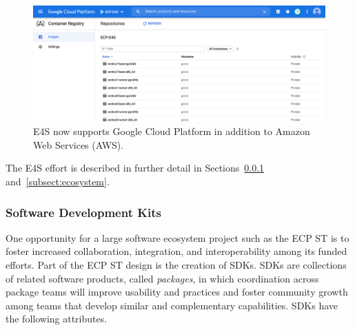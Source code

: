 \begin{figure}
	\centering
	\includegraphics[width=0.9\linewidth]{E4S-GCP}
	\caption{E4S now supports Google Cloud Platform in addition to Amazon Web Services (AWS).}
	\label{fig:e4s-gcp-image}
\end{figure}

The E4S effort is described in further detail in Sections~\ref{subsubsect:sdks} and~\ref{subsect:ecosystem}.

\subsubsection{Software Development Kits}\label{subsubsect:sdks}
One opportunity for a large software ecosystem project such as the ECP ST is to foster increased collaboration, integration, and interoperability among its funded efforts. Part of the ECP ST design is the creation of SDKs.  SDKs are collections of related software products, called \textit{packages}, in which coordination across package teams will improve usability and practices and foster community growth among teams that develop similar and complementary capabilities. SDKs have the following attributes.

